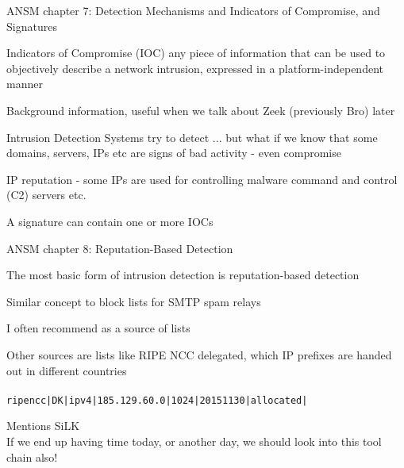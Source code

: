 \documentclass[Screen16to9,17pt]{foils}
\begin{document}
\begin{list1}
\item ANSM chapter 7: Detection Mechanisms and Indicators of Compromise, and Signatures

\begin{list2}
\item Indicators of Compromise (IOC) any piece of information that can be used to objectively describe a
network intrusion, expressed in a platform-independent manner
\item Background information, useful when we talk about Zeek (previously Bro) later
\item Intrusion Detection Systems try to detect ... but what if we know that some domains, servers, IPs etc are signs of bad activity - even compromise
\item IP reputation - some IPs are used for controlling malware command and control (C2) servers etc.
\item A signature can contain one or more IOCs
\end{list2}
\end{list1}




\begin{list1}
\item ANSM chapter 8: Reputation-Based Detection
\begin{list2}
\item The most basic form of intrusion detection is reputation-based detection
\item Similar concept to block lists for SMTP spam relays
\item I often recommend  as a source of lists
\item Other sources are lists like RIPE NCC delegated, which IP prefixes are handed out in different countries\\
\\
\verb+ripencc|DK|ipv4|185.129.60.0|1024|20151130|allocated|+
\item Mentions SiLK \\
If we end up having time today, or another day, we should look into this tool chain also!
\end{list2}
\end{list1}
\end{document}
